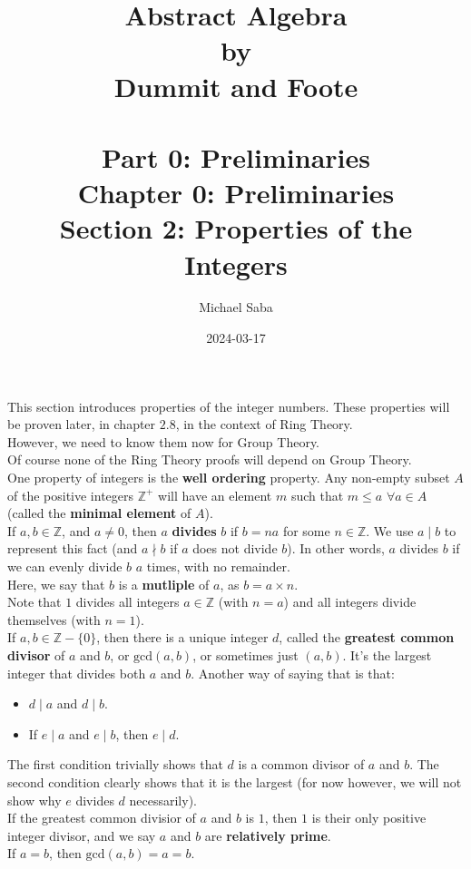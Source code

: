 \documentclass[12pt]{article}
\title{%
    \Huge Abstract Algebra \\
    \large by \\
    \Large Dummit and Foote \\~\\
    \huge Part 0: Preliminaries \\
    \LARGE Chapter 0: Preliminaries \\
    \Large Section 2: Properties of the Integers
}
\date{2024-03-17}
\author{Michael Saba}
\newcommand{\Z}{\mathbb{Z}}
\begin{document}
    \maketitle
    \newpage

    This section introduces properties of the integer numbers.
    These properties will be proven later, in chapter $2.8$,
    in the context of Ring Theory. \\
    However, we need to know them now for Group Theory. \\
    Of course none of the Ring Theory proofs will depend
    on Group Theory. \\

    One property of integers is the \textbf{well ordering} property.
    Any non-empty subset $A$ of the positive integers $\Z^+$
    will have an element $m$
    such that $m \leqslant a$ $\forall a \in A$
    (called the \textbf{minimal element} of $A$). \\

    If $a, b \in \Z$, and $a \neq 0$,
    then $a$ \textbf{divides} $b$ if $b = na$ for some $n \in \Z$.
    We use $a \mid b$ to represent this fact
    (and $a \nmid b$ if $a$ does not divide $b$).
    In other words, $a$ divides $b$ if we can evenly divide
    $b$ $a$ times, with no remainder. \\
    Here, we say that $b$ is a \textbf{mutliple} of $a$,
    as $b = a \times n$. \\
    Note that $1$ divides all integers $a \in \Z$ (with $n = a$)
    and all integers divide themselves (with $n = 1$). \\
    

    If $a, b \in \Z - \{0\}$,
    then there is a unique integer $d$,
    called the \textbf{greatest common divisor} of $a$ and $b$,
    or $\text{gcd}(a, b)$, or sometimes just $(a, b)$.
    It's the largest integer that divides both $a$ and $b$.
    Another way of saying that is that:
    \begin{itemize}[label=$\diamond$]
        \item 
            $d \mid a$ and $d \mid b$.
        \item
            If $e \mid a$ and $e \mid b$, then $e \mid d$.
    \end{itemize}
    The first condition trivially shows that $d$ is a common divisor
    of $a$ and $b$.
    The second condition clearly shows that it is the largest
    (for now however, we will not show why $e$ divides $d$
    necessarily). \\
    If the greatest common divisior of $a$ and $b$ is $1$,
    then $1$ is their only positive integer divisor, 
    and we say $a$ and $b$ are \textbf{relatively prime}. \\
    If $a = b$, then $\text{gcd}(a, b) = a = b$. \\
\end{document}
